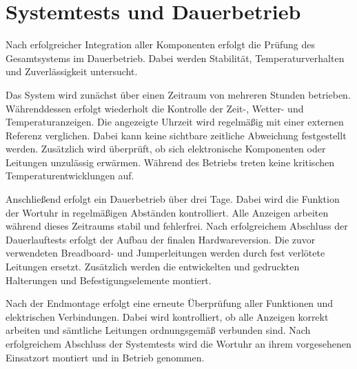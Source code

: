 \section{Systemtests und Dauerbetrieb} 
Nach erfolgreicher Integration aller Komponenten erfolgt die Prüfung des Gesamtsystems im Dauerbetrieb.  
Dabei werden Stabilität, Temperaturverhalten und Zuverlässigkeit untersucht.  

Das System wird zunächst über einen Zeitraum von mehreren Stunden betrieben.  
Währenddessen erfolgt wiederholt die Kontrolle der Zeit-, Wetter- und Temperaturanzeigen.  
Die angezeigte Uhrzeit wird regelmäßig mit einer externen Referenz verglichen.  
Dabei kann keine sichtbare zeitliche Abweichung festgestellt werden.  
Zusätzlich wird überprüft, ob sich elektronische Komponenten oder Leitungen unzulässig erwärmen.  
Während des Betriebs treten keine kritischen Temperaturentwicklungen auf.  

Anschließend erfolgt ein Dauerbetrieb über drei Tage.  
Dabei wird die Funktion der Wortuhr in regelmäßigen Abständen kontrolliert.  
Alle Anzeigen arbeiten während dieses Zeitraums stabil und fehlerfrei.  
Nach erfolgreichem Abschluss der Dauerlauftests erfolgt der Aufbau der finalen Hardwareversion.  
Die zuvor verwendeten Breadboard- und Jumperleitungen werden durch fest verlötete Leitungen ersetzt.  
Zusätzlich werden die entwickelten und gedruckten Halterungen und Befestigungselemente montiert.  

Nach der Endmontage erfolgt eine erneute Überprüfung aller Funktionen und elektrischen Verbindungen.  
Dabei wird kontrolliert, ob alle Anzeigen korrekt arbeiten und sämtliche Leitungen ordnungsgemäß verbunden sind.  
Nach erfolgreichem Abschluss der Systemtests wird die Wortuhr an ihrem vorgesehenen Einsatzort montiert und in Betrieb genommen.